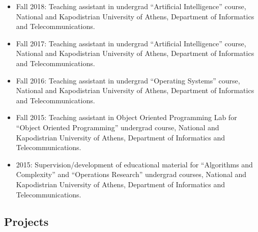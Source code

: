 \documentclass[a4paper,oneside,11pt]{article}
\begin{document}
\begin{itemize}

\item Fall 2018: Teaching assistant in undergrad ``Artificial Intelligence'' course, National and Kapodistrian University of Athens, Department of Informatics and Telecommunications.

\item Fall 2017: Teaching assistant in undergrad ``Artificial Intelligence'' course, National and Kapodistrian University of Athens, Department of Informatics and Telecommunications.

\item Fall 2016: Teaching assistant in undergrad ``Operating Systems'' course, National and Kapodistrian University of Athens, Department of Informatics and Telecommunications.

\item Fall 2015: Teaching assistant in Object Oriented Programming Lab for ``Object Oriented Programming'' undergrad course, National and Kapodistrian University of Athens, Department of Informatics and Telecommunications.

\item 2015: Supervision/development of educational material for ``Algorithms and Complexity'' and ``Operations Research'' undergrad courses, National and Kapodistrian University of Athens, Department of Informatics and Telecommunications.

\end{itemize}

\subsection*{Projects}
\end{document}
